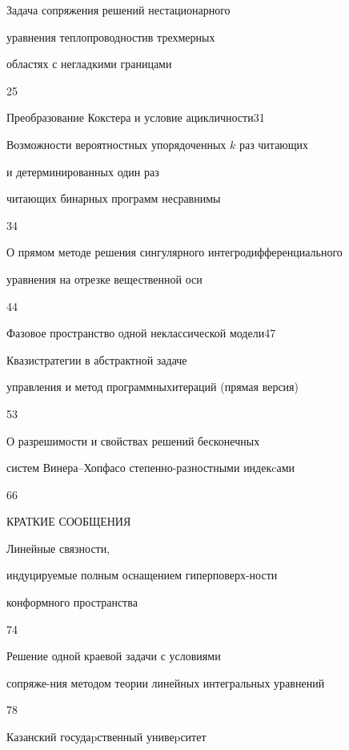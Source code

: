 

{Задача сопряжения решений нестационарного 


уравнения теплопроводности\newline в трехмерных


областях с негладкими границами}{25}




{Преобразование Кокстера и условие ацикличности}{31}




{Возможности вероятностных упорядоченных $k$ раз читающих\newline


и детерминированных один раз


читающих бинарных программ несравнимы}{34}




{О прямом методе решения сингулярного интегродифференциального\newline


уравнения на отрезке вещественной оси}{44}




{Фазовое пространство одной неклассической модели}{47}




{Квазистратегии в абстрактной задаче


управления и метод программных\newline итераций (прямая версия)}{53}




{О разрешимости и свойствах решений бесконечных


систем Винера--Хопфа\newline со степенно-разностными индекcами}{66}








\bigskip


\begin{center}


КРАТКИЕ СООБЩЕНИЯ


\end{center}










{Линейные связности, 


индуцируемые полным оснащением гиперповерх-\newline ности 


конформного пространства}{74}




{Решение одной краевой задачи с условиями 


сопряже-\newline ния методом теории линейных интегральных уравнений}{78}








\vfill


\noindent\raisebox{2pt}{\copyright} Казанский госудаpственный унивеpситет





